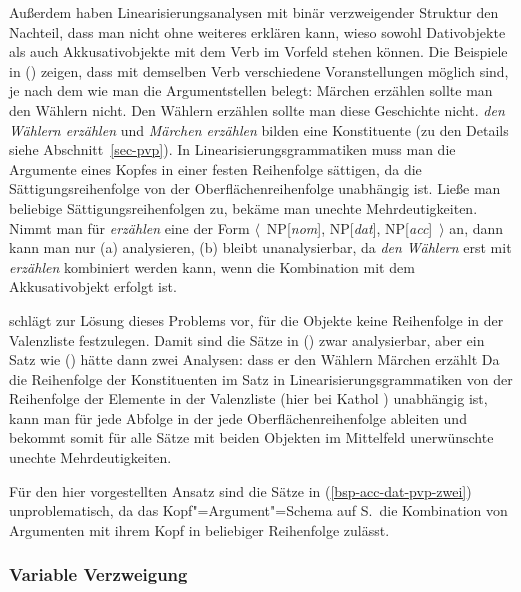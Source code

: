 %
Außerdem haben Linearisierungsanalysen mit binär verzweigender Struktur den Nachteil,
dass man nicht ohne weiteres erklären kann,
wieso sowohl Dativobjekte als auch Akkusativobjekte mit dem Verb im Vorfeld stehen können.
Die Beispiele in () zeigen, dass mit demselben Verb verschiedene Voranstellungen möglich sind,
je nach dem wie man die Argumentstellen belegt:
\eal
\label{bsp-acc-dat-pvp-zwei}
\ex Märchen erzählen sollte man den Wählern nicht.
\ex Den Wählern erzählen sollte man diese Geschichte nicht.
\zl
\emph{den Wählern erzählen} und \emph{Märchen erzählen} bilden eine Konstituente (zu den Details
siehe Abschnitt~\ref{sec-pvp}). In Linearisierungsgrammatiken muss man die Argumente eines Kopfes
in einer festen Reihenfolge sättigen, da die Sättigungsreihenfolge von der Oberflächenreihenfolge unabhängig ist. Ließe
man beliebige Sättigungsreihenfolgen zu, bekäme man unechte Mehrdeutigkeiten.
Nimmt man für \emph{erzählen} eine \compsl der Form $\langle$~NP[\textit{nom}], NP[\textit{dat}],
NP[\textit{acc}]~$\rangle$ an, dann kann man nur (a) analysieren, (b) bleibt unanalysierbar,
da \emph{den Wählern} erst mit \emph{erzählen} kombiniert werden kann, wenn die Kombination
mit dem Akkusativobjekt erfolgt ist.

\citet[]{Kathol2000a} schlägt zur Lösung dieses Problems vor,
für die Objekte keine Reihenfolge in der Valenzliste festzulegen. Damit sind
die Sätze in () zwar analysierbar, aber ein Satz wie () hätte
dann zwei Analysen:
\ea
dass er den Wählern Märchen erzählt
\z
Da die Reihenfolge der Konstituenten im Satz in Linearisierungsgrammatiken
von der Reihenfolge der Elemente in der Valenzliste (hier \comps bei Kathol \subcat) unabhängig ist, kann man
für jede Abfolge in der \compsl jede Oberflächenreihenfolge ableiten und bekommt
somit für alle Sätze mit beiden Objekten im Mittelfeld unerwünschte unechte Mehrdeutigkeiten.

Für den hier vorgestellten Ansatz sind die Sätze in (\ref{bsp-acc-dat-pvp-zwei}) unproblematisch,
da das Kopf"=Argument"=Schema auf S.\,\pageref{schema-Kopf-Komplementschema-prel2} die Kombination von Argumenten
mit ihrem Kopf in beliebiger Reihenfolge zulässt.
%
%


\subsubsection{Variable Verzweigung}
\label{crysmann}

